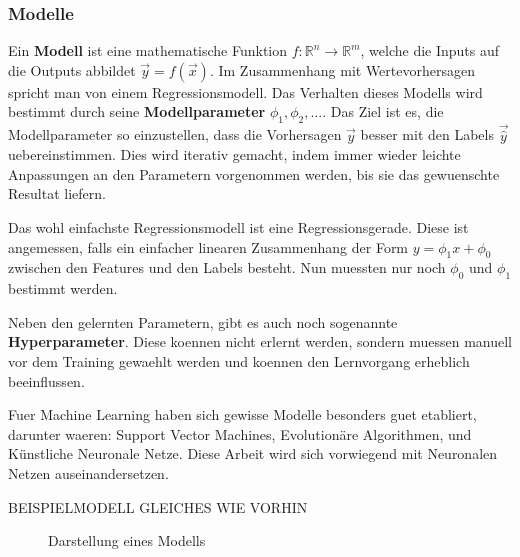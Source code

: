 \documentclass[../main]{subfiles}
\begin{document}
\subsubsection{Modelle}
Ein \textbf{Modell} ist eine mathematische Funktion $\mathit{f}\colon \mathbb{R}^n \to \mathbb{R}^m$, welche die Inputs auf die Outputs abbildet $\vec{y}=\mathit{f}(\vec{x})$.
Im Zusammenhang mit Wertevorhersagen spricht man von einem Regressionsmodell.
Das Verhalten dieses Modells wird bestimmt durch seine \textbf{Modellparameter} $\phi_1, \phi_2,\ldots$.
Das Ziel ist es, die Modellparameter so einzustellen, dass die Vorhersagen $\vec{y}$ besser mit den Labels $\vec{\hat{y}}$ uebereinstimmen.
Dies wird iterativ gemacht, indem immer wieder leichte Anpassungen an den Parametern vorgenommen werden, bis sie das gewuenschte Resultat liefern.
\par\medskip
Das wohl einfachste Regressionsmodell ist eine Regressionsgerade. Diese ist
angemessen, falls ein einfacher linearen Zusammenhang der Form $y=\phi_1x +
\phi_0$ zwischen den Features und den Labels besteht.
Nun muessten nur noch $\phi_0$ und $\phi_1$ bestimmt werden.

Neben den gelernten Parametern, gibt es auch noch sogenannte \textbf{Hyperparameter}.
Diese koennen nicht erlernt werden, sondern muessen manuell vor dem Training gewaehlt werden und koennen den Lernvorgang erheblich beeinflussen.
\par\medskip
Fuer Machine Learning haben sich gewisse Modelle besonders guet etabliert,
darunter waeren: Support Vector Machines, Evolutionäre Algorithmen, und Künstliche Neuronale Netze.
Diese Arbeit wird sich vorwiegend mit Neuronalen Netzen auseinandersetzen.
\par\medskip
BEISPIELMODELL GLEICHES WIE VORHIN

\begin{figure}[h!]
  \centering


  \caption{Darstellung eines Modells}
\end{figure}
\end{document}
